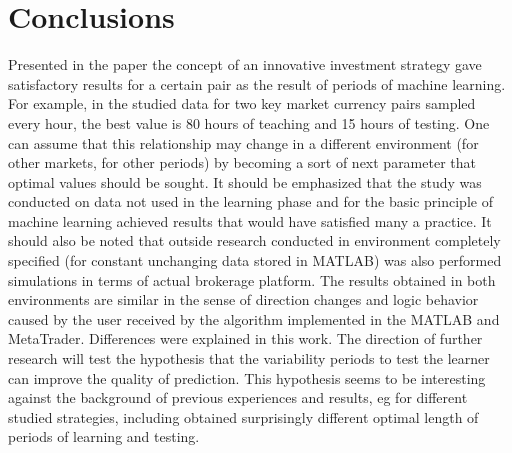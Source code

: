 \documentclass[runningheads,a4paper]{llncs}
\begin{document}
\section{Conclusions}

Presented in the paper the concept of an innovative investment strategy gave satisfactory results for a certain pair as the result of periods of machine learning. For example, in the studied data for two key market currency pairs sampled every hour, the best value is 80 hours of teaching and 15 hours of testing. One can assume that this relationship may change in a different environment (for other markets, for other periods) by becoming a sort of next parameter that optimal values should be sought. It should be emphasized that the study was conducted on data not used in the learning phase and for the basic principle of machine learning achieved results that would have satisfied many a practice. It should also be noted that outside research conducted in environment completely specified (for constant unchanging data stored in MATLAB) was also performed simulations in terms of actual brokerage platform. The results obtained in both environments are similar in the sense of direction changes and logic behavior caused by the user received by the algorithm implemented in the MATLAB and MetaTrader. Differences were explained in this work.
The direction of further research will test the hypothesis that the variability periods to test the learner can improve the quality of prediction. This hypothesis seems to be interesting against the background of previous experiences and results, eg for different studied strategies, including \cite{Wilinski2014}\cite{Wilinski}\cite{sinclare}\cite{krutsinger} obtained surprisingly different optimal length of periods of learning and testing.





\end{document}
